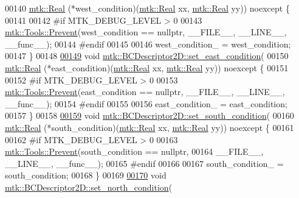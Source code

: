 \begin{DoxyCode}
00140     \hyperlink{group__c01-roots_gac080bbbf5cbb5502c9f00405f894857d}{mtk::Real} (*west\_condition)(\hyperlink{group__c01-roots_gac080bbbf5cbb5502c9f00405f894857d}{mtk::Real} xx, \hyperlink{group__c01-roots_gac080bbbf5cbb5502c9f00405f894857d}{mtk::Real} yy)) noexcept \{
00141 
00142 \textcolor{preprocessor}{  #if MTK\_DEBUG\_LEVEL > 0}
00143   \hyperlink{classmtk_1_1Tools_a332324c6f25e66be9dff48c5987a3b9f}{mtk::Tools::Prevent}(west\_condition == \textcolor{keyword}{nullptr}, \_\_FILE\_\_, \_\_LINE\_\_, \_\_func\_\_);
00144 \textcolor{preprocessor}{  #endif}
00145 
00146   west\_condition\_ = west\_condition;
00147 \}
00148 
\hypertarget{mtk__bc__descriptor__2d_8cc_source_l00149}{}\hyperlink{classmtk_1_1BCDescriptor2D_a4ba8690e845f59a1507b056f3fc8061e}{00149} \textcolor{keywordtype}{void} \hyperlink{classmtk_1_1BCDescriptor2D_a4ba8690e845f59a1507b056f3fc8061e}{mtk::BCDescriptor2D::set\_east\_condition}(
00150     \hyperlink{group__c01-roots_gac080bbbf5cbb5502c9f00405f894857d}{mtk::Real} (*east\_condition)(\hyperlink{group__c01-roots_gac080bbbf5cbb5502c9f00405f894857d}{mtk::Real} xx, \hyperlink{group__c01-roots_gac080bbbf5cbb5502c9f00405f894857d}{mtk::Real} yy)) noexcept \{
00151 
00152 \textcolor{preprocessor}{  #if MTK\_DEBUG\_LEVEL > 0}
00153   \hyperlink{classmtk_1_1Tools_a332324c6f25e66be9dff48c5987a3b9f}{mtk::Tools::Prevent}(east\_condition == \textcolor{keyword}{nullptr}, \_\_FILE\_\_, \_\_LINE\_\_, \_\_func\_\_);
00154 \textcolor{preprocessor}{  #endif}
00155 
00156   east\_condition\_ = east\_condition;
00157 \}
00158 
\hypertarget{mtk__bc__descriptor__2d_8cc_source_l00159}{}\hyperlink{classmtk_1_1BCDescriptor2D_a408f159cc44d7ee610191efb8ed48b2a}{00159} \textcolor{keywordtype}{void} \hyperlink{classmtk_1_1BCDescriptor2D_a408f159cc44d7ee610191efb8ed48b2a}{mtk::BCDescriptor2D::set\_south\_condition}(
00160     \hyperlink{group__c01-roots_gac080bbbf5cbb5502c9f00405f894857d}{mtk::Real} (*south\_condition)(\hyperlink{group__c01-roots_gac080bbbf5cbb5502c9f00405f894857d}{mtk::Real} xx, \hyperlink{group__c01-roots_gac080bbbf5cbb5502c9f00405f894857d}{mtk::Real} yy)) noexcept \{
00161 
00162 \textcolor{preprocessor}{  #if MTK\_DEBUG\_LEVEL > 0}
00163   \hyperlink{classmtk_1_1Tools_a332324c6f25e66be9dff48c5987a3b9f}{mtk::Tools::Prevent}(south\_condition == \textcolor{keyword}{nullptr},
00164                       \_\_FILE\_\_, \_\_LINE\_\_, \_\_func\_\_);
00165 \textcolor{preprocessor}{  #endif}
00166 
00167   south\_condition\_ = south\_condition;
00168 \}
00169 
\hypertarget{mtk__bc__descriptor__2d_8cc_source_l00170}{}\hyperlink{classmtk_1_1BCDescriptor2D_a690f6881a88b202c074d9f90f2a7ddb0}{00170} \textcolor{keywordtype}{void} \hyperlink{classmtk_1_1BCDescriptor2D_a690f6881a88b202c074d9f90f2a7ddb0}{mtk::BCDescriptor2D::set\_north\_condition}(

\end{DoxyCode}
